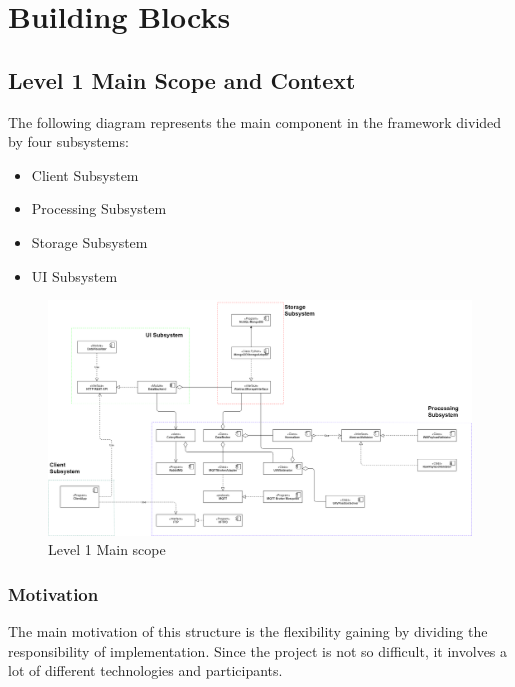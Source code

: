 \hypertarget{building-blocks}{%
\section{Building Blocks}\label{building-blocks}}

\hypertarget{level-1-main-scope-and-context}{%
\subsection{Level 1 Main Scope and
Context}\label{level-1-main-scope-and-context}}

The following diagram represents the main component in the framework
divided by four subsystems:

\begin{itemize}
\tightlist
\item
  Client Subsystem
\item
  Processing Subsystem
\item
  Storage Subsystem
\item
  UI Subsystem
\end{itemize}

\begin{figure}
\centering
\includegraphics{schemes/classes/ClassDiagram_overview.png}
\caption{Level 1 Main scope}
\end{figure}

\hypertarget{motivation}{%
\subsubsection{Motivation}\label{motivation}}

The main motivation of this structure is the flexibility gaining by
dividing the responsibility of implementation. Since the project is not
so difficult, it involves a lot of different technologies and
participants.

